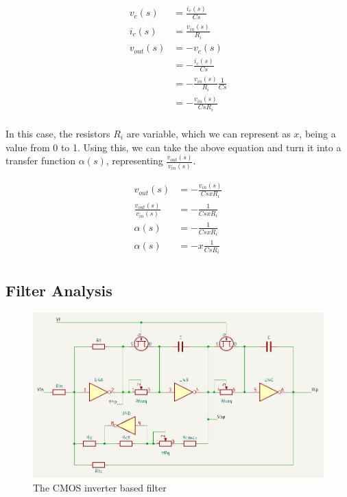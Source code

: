\documentclass{article}
\begin{document}
\begin{equation*}
\begin{split}
  v_c(s) & = \frac{i_c(s)}{Cs} \\
  i_c(s) & = \frac{v_{in}(s)}{R_{i}} \\
  v_{out}(s) & = -v_c(s) \\
             & = -\frac{i_c(s)}{Cs} \\
             & = -\frac{v_{in}(s)}{R_{i}}\frac{1}{Cs} \\
             & = -\frac{v_{in}(s)}{CsR_{i}} \\
\end{split}
\end{equation*}

In this case, the resistors $R_{i}$ are variable, which we can represent as $x$, being a value from 0 to 1. Using this,  we can take the above equation and turn it into a transfer function $\alpha(s)$, representing $\frac{v_{out}(s)}{v_{in}(s)}$.

\begin{equation*}
\begin{split}
  v_{out}(s) & = -\frac{v_{in}(s)}{CsxR_{i}} \\
  \frac{v_{out}(s)}{v_{in}(s)} & = -\frac{1}{CsxR_{i}} \\
  \alpha(s) & = -\frac{1}{CsxR_{i}} \\
  \alpha(s) & = -x\frac{1}{CsR_{i}} \\
\end{split}
\end{equation*}

\subsection{Filter Analysis}

\begin{figure}[h]
  \caption{The CMOS inverter based filter}
  \includegraphics[width=\linewidth]{images/filter-circuit.png}
\end{figure}
\end{document}
